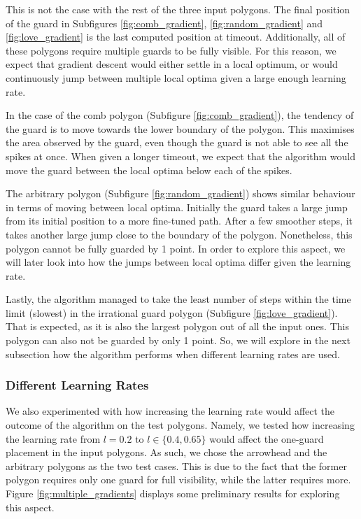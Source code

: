 This is not the case with the rest of the three input polygons. The final position of the guard in Subfigures \ref{fig:comb_gradient}, \ref{fig:random_gradient} and \ref{fig:love_gradient} is the last computed position at timeout. Additionally, all of these polygons require multiple guards to be fully visible. For this reason, we expect that gradient descent would either settle in a local optimum, or would continuously jump between multiple local optima given a large enough learning rate.

In the case of the comb polygon (Subfigure \ref{fig:comb_gradient}), the tendency of the guard is to move towards the lower boundary of the polygon. This maximises the area observed by the guard, even though the guard is not able to see all the spikes at once. When given a longer timeout, we expect that the algorithm would move the guard between the local optima below each of the spikes.

The arbitrary polygon (Subfigure \ref{fig:random_gradient}) shows similar behaviour in terms of moving between local optima. Initially the guard takes a large jump from its initial position to a more fine-tuned path. After a few smoother steps, it takes another large jump close to the boundary of the polygon. Nonetheless, this polygon cannot be fully guarded by 1 point. In order to explore this aspect, we will later look into how the jumps between local optima differ given the learning rate.

Lastly, the algorithm managed to take the least number of steps within the time limit (slowest) in the irrational guard polygon (Subfigure \ref{fig:love_gradient}). That is expected, as it is also the largest polygon out of all the input ones. This polygon can also not be guarded by only 1 point. So, we will explore in the next subsection how the algorithm performs when different learning rates are used. 


\subsubsection{Different Learning Rates}
We also experimented with how increasing the learning rate would affect the outcome of the algorithm on the test polygons. Namely, we tested how increasing the learning rate from $l = 0.2$ to $l \in \{0.4, 0.65\}$ would affect the one-guard placement in the input polygons. As such, we chose the arrowhead and the arbitrary polygons as the two test cases. This is due to the fact that the former polygon requires only one guard for full visibility, while the latter requires more. Figure \ref{fig:multiple_gradients} displays some preliminary results for exploring this aspect. 

